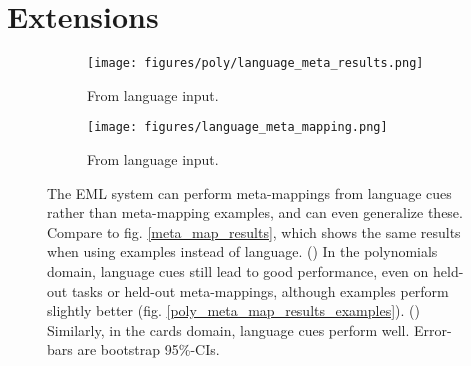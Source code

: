 \documentclass{article}
\begin{document}
\section{Extensions}
\begin{figure}
\centering
\begin{subfigure}{0.5\textwidth}
\texttt{[image: figures/poly/language\_meta\_results.png]}
\caption{From language input.}
\label{poly_meta_map_results_language}
\end{subfigure}%
\begin{subfigure}{0.5\textwidth}
\texttt{[image: figures/language\_meta\_mapping.png]}
\caption{From language input.}
\label{cards_meta_map_results_language}
\end{subfigure}
\caption{The EML system can perform meta-mappings from language cues rather than meta-mapping examples, and can even generalize these. Compare to fig. \ref{meta_map_results}, which shows the same results when using examples instead of language. () In the polynomials domain, language cues still lead to good performance, even on held-out tasks or held-out meta-mappings, although examples perform slightly better (fig. \ref{poly_meta_map_results_examples}). () Similarly, in the cards domain, language cues perform well. Error-bars are bootstrap 95\%-CIs.}
\label{language_meta_map_results}
\end{figure}
\end{document}

